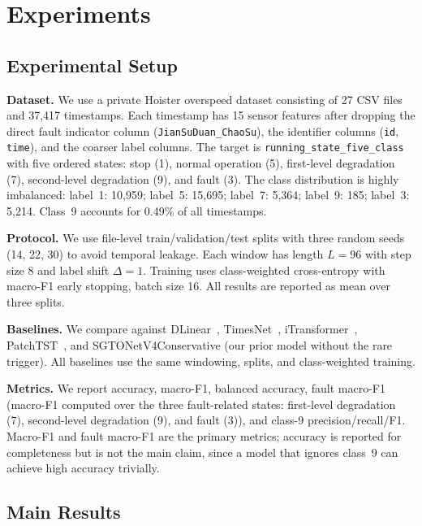 \section{Experiments}
\label{sec:experiments}

\subsection{Experimental Setup}

\textbf{Dataset.}
We use a private Hoister overspeed dataset consisting of 27 CSV files and 37,417 timestamps.
Each timestamp has 15 sensor features after dropping the direct fault indicator column (\texttt{JianSuDuan\_ChaoSu}), the identifier columns (\texttt{id}, \texttt{time}), and the coarser label columns.
The target is \texttt{running\_state\_five\_class} with five ordered states: stop (1), normal operation (5), first-level degradation (7), second-level degradation (9), and fault (3).
The class distribution is highly imbalanced: label~1: 10,959; label~5: 15,695; label~7: 5,364; label~9: 185; label~3: 5,214.
Class~9 accounts for 0.49\% of all timestamps.

\textbf{Protocol.}
We use file-level train/validation/test splits with three random seeds (14, 22, 30) to avoid temporal leakage.
Each window has length $L = 96$ with step size 8 and label shift $\Delta = 1$.
Training uses class-weighted cross-entropy with macro-F1 early stopping, batch size 16.
All results are reported as mean over three splits.

\textbf{Baselines.}
We compare against DLinear~\cite{zeng2023dlinear}, TimesNet~\cite{wu2023timesnet}, iTransformer~\cite{liu2024itransformer}, PatchTST~\cite{nie2023patchtst}, and SGTONetV4Conservative (our prior model without the rare trigger).
All baselines use the same windowing, splits, and class-weighted training.

\textbf{Metrics.}
We report accuracy, macro-F1, balanced accuracy, fault macro-F1 (macro-F1 computed over the three fault-related states: first-level degradation (7), second-level degradation (9), and fault (3)), and class-9 precision/recall/F1.
Macro-F1 and fault macro-F1 are the primary metrics; accuracy is reported for completeness but is not the main claim, since a model that ignores class~9 can achieve high accuracy trivially.

\subsection{Main Results}

